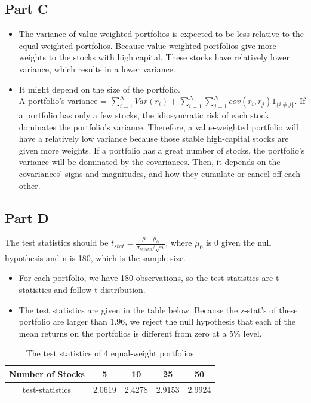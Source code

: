 \documentclass{report}
\begin{document}
\subsection{Part C}
\begin{itemize}
	\item The variance of value-weighted portfolios is expected to be less relative to the equal-weighted portfolios. Because value-weighted portfolios give more weights to the stocks with high capital. These stocks have relatively lower variance, which results in a lower variance. 
	\item It might depend on the size of the portfolio. \\A portfolio's variance = $\sum_{i=1}^{N}Var(r_i) + \sum_{i=1}^{N}\sum_{j=1}^{N}cov(r_i,r_j)1_{\{ i\ne j\}}$. If a portfolio has only a few stocks, the idiosyncratic risk of each stock dominates the portfolio's variance. Therefore, a value-weighted portfolio will have a relatively low variance because those stable high-capital stocks are given more weights. If a portfolio has a great number of stocks, the portfolio's variance will be dominated by the covariances. Then, it depends on the covariances' signs and magnitudes, and how they cumulate or cancel off each other.
\end{itemize}

\subsection{Part D}
The test statistics should be $t_{stat} = \frac{\mu - \mu_0}{\sigma_{return}/\sqrt{n}}$, where $\mu_0$ is 0 given the null hypothesis and n is 180, which is the sample size.
\begin{itemize}
	\item For each portfolio, we have 180 observations, so the test statistics are t-statistics and follow t distribution. 
	\item The test statistics are given in the table below. Because the z-stat's of these portfolio are larger than 1.96, we reject the null hypothesis that each of the mean returns on the portfolios is different from zero at a 5\%  level.
\end{itemize}
\begin{table}[H]
	\centering
	\caption{The test statistics of 4 equal-weight portfolios}
	\begin{tabular}{ccccc}\hline\hline
	Number of Stocks & 5 & 10 & 25 & 50 \\\hline
	test-statistics & 2.0619 & 2.4278 & 2.9153 & 2.9924 \\ \hline
	\end{tabular}
\end{table}
\end{document}
